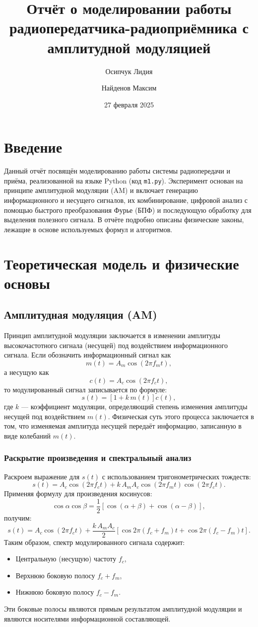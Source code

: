 \documentclass[12pt]{article}
\title{Отчёт о моделировании работы радиопередатчика-радиоприёмника с амплитудной модуляцией}
\author{Осипчук Лидия \and Найденов Максим}
\date{27 февраля 2025}
\begin{document}
\maketitle

\section{Введение}
Данный отчёт посвящён моделированию работы системы радиопередачи и приёма, реализованной на языке Python (код \texttt{m1.py}). Эксперимент основан на принципе амплитудной модуляции (AM) и включает генерацию информационного и несущего сигналов, их комбинирование, цифровой анализ с помощью быстрого преобразования Фурье (БПФ) и последующую обработку для выделения полезного сигнала. В отчёте подробно описаны физические законы, лежащие в основе используемых формул и алгоритмов.

\section{Теоретическая модель и физические основы}
\subsection{Амплитудная модуляция (AM)}
Принцип амплитудной модуляции заключается в изменении амплитуды высокочастотного сигнала (несущей) под воздействием информационного сигнала. Если обозначить информационный сигнал как
\[
m(t) = A_m \cos(2\pi f_m t),
\]
а несущую как
\[
c(t) = A_c \cos(2\pi f_c t),
\]
то модулированный сигнал записывается по формуле:
\[
s(t) = \left[1 + k\, m(t)\right] c(t),
\]
где \(k\) --- коэффициент модуляции, определяющий степень изменения амплитуды несущей под воздействием \(m(t)\). Физическая суть этого процесса заключается в том, что изменяемая амплитуда несущей передаёт информацию, записанную в виде колебаний \(m(t)\).

\subsubsection{Раскрытие произведения и спектральный анализ}
Раскроем выражение для \(s(t)\) с использованием тригонометрических тождеств:
\[
s(t) = A_c \cos(2\pi f_c t) + k\,A_m A_c \cos(2\pi f_m t) \cos(2\pi f_c t).
\]
Применяя формулу для произведения косинусов:
\[
\cos \alpha \cos \beta = \frac{1}{2}\left[\cos(\alpha+\beta) + \cos(\alpha-\beta)\right],
\]
получим:
\[
s(t) = A_c \cos(2\pi f_c t) + \frac{k\,A_m A_c}{2} \left[\cos 2\pi(f_c+f_m)t + \cos 2\pi(f_c-f_m)t\right].
\]
Таким образом, спектр модулированного сигнала содержит:
\begin{itemize}
    \item Центральную (несущую) частоту \(f_c\),
    \item Верхнюю боковую полосу \(f_c+f_m\),
    \item Нижнюю боковую полосу \(f_c-f_m\).
\end{itemize}
Эти боковые полосы являются прямым результатом амплитудной модуляции и являются носителями информационной составляющей.
\end{document}
